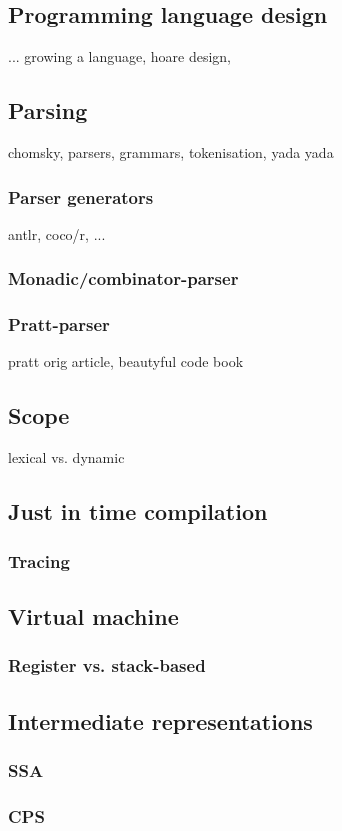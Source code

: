 \subsection{Programming language design}
... growing a language, hoare design,
\subsection{Parsing}
chomsky, parsers, grammars, tokenisation, yada yada
\subsubsection{Parser generators}
antlr, coco/r, ...
\subsubsection{Monadic/combinator-parser}
\subsubsection{Pratt-parser}
pratt orig article, beautyful code book
\subsection{Scope}
lexical vs. dynamic
\subsection{Just in time compilation}
\subsubsection{Tracing}
\subsection{Virtual machine}
\subsubsection{Register vs. stack-based}
\subsection{Intermediate representations}
\subsubsection{SSA}
\subsubsection{CPS}
